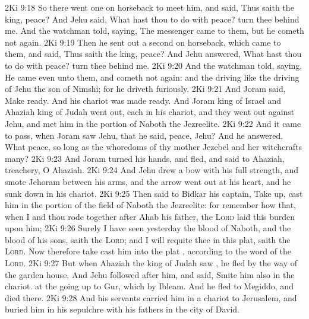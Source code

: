 \vs 2Ki 9:18 So there went one on horseback to meet him, and said, Thus saith the king,  peace? And Jehu said, What hast thou to do with peace? turn thee behind me. And the watchman told, saying, The messenger came to them, but he cometh not again.
\vs 2Ki 9:19 Then he sent out a second on horseback, which came to them, and said, Thus saith the king,  peace? And Jehu answered, What hast thou to do with peace? turn thee behind me.
\vs 2Ki 9:20 And the watchman told, saying, He came even unto them, and cometh not again: and the driving  like the driving of Jehu the son of Nimshi; for he driveth furiously.
\vs 2Ki 9:21 And Joram said, Make ready. And his chariot was made ready. And Joram king of Israel and Ahaziah king of Judah went out, each in his chariot, and they went out against Jehu, and met him in the portion of Naboth the Jezreelite.
\vs 2Ki 9:22 And it came to pass, when Joram saw Jehu, that he said,  peace, Jehu? And he answered, What peace, so long as the whoredoms of thy mother Jezebel and her witchcrafts  many?
\vs 2Ki 9:23 And Joram turned his hands, and fled, and said to Ahaziah,  treachery, O Ahaziah.
\vs 2Ki 9:24 And Jehu drew a bow with his full strength, and smote Jehoram between his arms, and the arrow went out at his heart, and he sunk down in his chariot.
\vs 2Ki 9:25 Then said  to Bidkar his captain, Take up,  cast him in the portion of the field of Naboth the Jezreelite: for remember how that, when I and thou rode together after Ahab his father, the \textsc{Lord} laid this burden upon him;
\vs 2Ki 9:26 Surely I have seen yesterday the blood of Naboth, and the blood of his sons, saith the \textsc{Lord}; and I will requite thee in this plat, saith the \textsc{Lord}. Now therefore take  cast him into the plat , according to the word of the \textsc{Lord}.
\vs 2Ki 9:27 But when Ahaziah the king of Judah saw , he fled by the way of the garden house. And Jehu followed after him, and said, Smite him also in the chariot.  at the going up to Gur, which  by Ibleam. And he fled to Megiddo, and died there.
\vs 2Ki 9:28 And his servants carried him in a chariot to Jerusalem, and buried him in his sepulchre with his fathers in the city of David.
